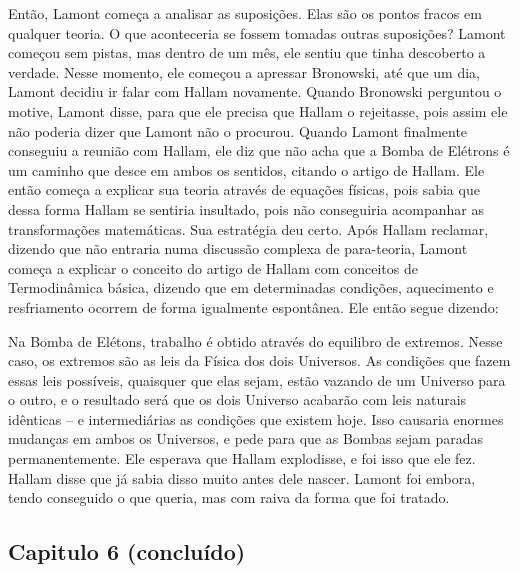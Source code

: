 \documentclass[14pt,portuguese]{extreport}
\begin{document}
	  Então, Lamont começa a analisar as suposições. Elas são os pontos fracos em qualquer teoria. 
	  O que aconteceria se fossem tomadas outras suposições? Lamont começou sem pistas, mas dentro 
	  de um mês, ele sentiu que tinha descoberto a verdade. Nesse momento, ele começou a apressar 
	  Bronowski, até que um dia, Lamont decidiu ir falar com Hallam novamente. Quando Bronowski 
	  perguntou o motive, Lamont disse, para que ele precisa que Hallam o rejeitasse, pois assim 
	  ele não poderia dizer que Lamont não o procurou. Quando Lamont finalmente conseguiu a reunião 
	  com Hallam, ele diz que não acha que a Bomba de Elétrons é um caminho que desce em ambos os 
	  sentidos, citando o artigo de Hallam. Ele então começa a explicar sua teoria através de 
	  equações físicas, pois sabia que dessa forma Hallam se sentiria insultado, pois não 
	  conseguiria acompanhar as transformações matemáticas. Sua estratégia deu certo. Após Hallam 
	  reclamar, dizendo que não entraria numa discussão complexa de para-teoria, Lamont começa 
	  a explicar o conceito do artigo de Hallam com conceitos de Termodinâmica básica, dizendo 
	  que em determinadas condições, aquecimento e resfriamento ocorrem de forma igualmente 
	  espontânea. Ele então segue dizendo:
    
	  Na Bomba de Elétons, trabalho é obtido através do equilibro de extremos. Nesse caso, os 
	  extremos são as leis da Física dos dois Universos. As condições que fazem essas leis 
	  possíveis, quaisquer que elas sejam, estão vazando de um Universo para o outro, e o 
	  resultado será que os dois Universo acabarão com leis naturais idênticas – e intermediárias 
	  as condições que existem hoje. Isso causaria enormes mudanças em ambos os Universos, e 
	  pede para que as Bombas sejam paradas permanentemente. Ele esperava que Hallam explodisse, 
	  e foi isso que ele fez. Hallam disse que já sabia disso muito antes dele nascer. Lamont 
	  foi embora, tendo conseguido o que queria, mas com raiva da forma que foi tratado.

	\subsection{Capitulo 6 (concluído)}
\end{document}
